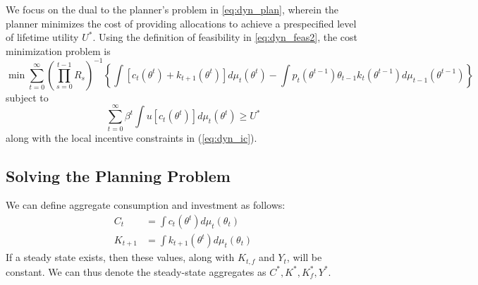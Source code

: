 \documentclass[11pt]{article}
\begin{document}
We focus on the dual to the planner's problem in \eqref{eq:dyn_plan}, wherein the planner minimizes the cost of providing allocations to achieve a prespecified level of lifetime utility \( U^* \). Using the definition of feasibility in \eqref{eq:dyn_feas2}, the cost minimization problem is 
\begin{equation}
    \min\sum_{t=0}^{\infty}\left(\prod_{s=0}^{t-1}R_{s}\right)^{-1}\left\{ \int\left[c_{t}\left(\theta^{t}\right)+k_{t+1}\left(\theta^{t}\right)\right]d\mu_{t}\left(\theta^{t}\right)-\int p_{t}\left(\theta^{t-1}\right)\theta_{t-1}k_{t}\left(\theta^{t-1}\right)d\mu_{t-1}\left(\theta^{t-1}\right)\right\} \label{eq:cost_obj}
\end{equation}
subject to 
\begin{equation}
    \sum_{t=0}^{\infty}\beta^{t}\int u\left[c_{t}\left(\theta^{t}\right)\right]d\mu_{t}\left(\theta^{t}\right)\ge U^{*}\label{eq:cost_constr}
\end{equation}
along with the local incentive constraints in (\ref{eq:dyn_ic}).

\subsection{Solving the Planning Problem}
We can define aggregate consumption and investment as follows: 
\begin{align}
    C_{t}&=\int c_{t}\left(\theta^{t}\right)d\mu_{t}\left(\theta_{t}\right)\\
    K_{t+1}&=\int k_{t+1}\left(\theta^{t}\right)d\mu_{t}\left(\theta_{t}\right)
\end{align}
If a steady state exists, then these values, along with \( K_{t,f} \) and \( Y_t \), will be constant. We can thus denote the steady-state aggregates as \( C^*,K^*,K_f^*,Y^* \). 
\end{document}
